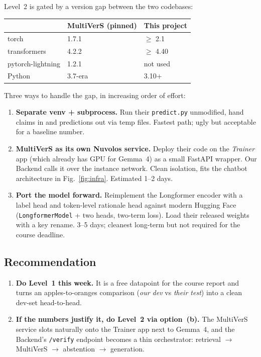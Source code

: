 \documentclass[11pt,a4paper]{article}
\begin{document}
Level~2 is gated by a version gap between the two codebases:

\begin{center}
\begin{tabular}{@{}lll@{}}
\toprule
 & \textbf{MultiVerS (pinned)} & \textbf{This project} \\
\midrule
torch             & 1.7.1  & $\geq$ 2.1 \\
transformers      & 4.2.2  & $\geq$ 4.40 \\
pytorch-lightning & 1.2.1  & not used \\
Python            & 3.7-era & 3.10+ \\
\bottomrule
\end{tabular}
\end{center}

Three ways to handle the gap, in increasing order of effort:

\begin{enumerate}
  \item \textbf{Separate venv + subprocess.} Run their \texttt{predict.py}
        unmodified, hand claims in and predictions out via temp files.
        Fastest path; ugly but acceptable for a baseline number.
  \item \textbf{MultiVerS as its own Nuvolos service.}
        Deploy their code on the \textit{Trainer} app (which already
        has GPU for Gemma~4) as a small FastAPI wrapper. Our Backend
        calls it over the instance network. Clean isolation, fits the
        chatbot architecture in Fig.~\ref{fig:infra}. Estimated 1--2 days.
  \item \textbf{Port the model forward.} Reimplement the Longformer
        encoder with a label head and token-level rationale head
        against modern Hugging Face (\texttt{LongformerModel} + two
        heads, two-term loss). Load their released weights with a key
        rename. 3--5 days; cleanest long-term but not required for the
        course deadline.
\end{enumerate}

\subsection{Recommendation}

\begin{enumerate}
  \item \textbf{Do Level~1 this week.} It is a free datapoint for the
        course report and turns an apples-to-oranges comparison
        (\textit{our dev} vs \textit{their test}) into a clean dev-set
        head-to-head.
  \item \textbf{If the numbers justify it, do Level~2 via option~(b).}
        The MultiVerS service slots naturally onto the Trainer app next
        to Gemma~4, and the Backend's \texttt{/verify} endpoint becomes
        a thin orchestrator: retrieval $\to$ MultiVerS $\to$ abstention
        $\to$ generation.
\end{enumerate}
\end{document}
